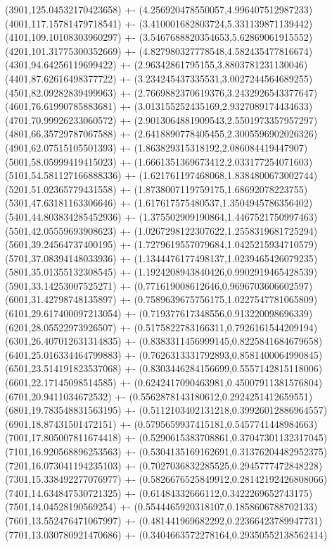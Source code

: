 {(3901,125.04532170423658) +- (4.256920478550057,4.996407512987233)
(4001,117.15781479718541) +- (3.410001682803724,5.331139871139442)
(4101,109.10108303960297) +- (3.5467688820354653,5.62869061915552)
(4201,101.31775300352669) +- (4.827980327778548,4.582435477816674)
(4301,94.64256119699422) +- (2.96342861795155,3.8803781231130046)
(4401,87.62616498377722) +- (3.234245437335531,3.0027244564689255)
(4501,82.09282839499963) +- (2.7669882370619376,3.2432926543377647)
(4601,76.61990785883681) +- (3.013155252435169,2.9327089174434633)
(4701,70.99926233060572) +- (2.9013064881909543,2.5501973357957297)
(4801,66.35729787067588) +- (2.6418890778405455,2.3005596902026326)
(4901,62.07515105501393) +- (1.863829315318192,2.086084419447907)
(5001,58.05999419415023) +- (1.6661351369673412,2.033177254071603)
(5101,54.581127166888336) +- (1.621761197468068,1.8384800673002744)
(5201,51.02365779431558) +- (1.8738007119759175,1.68692078223755)
(5301,47.63181163306646) +- (1.617617575480537,1.3504945786356402)
(5401,44.803834285452936) +- (1.375502909190864,1.4467521750997463)
(5501,42.05559693908623) +- (1.0267298122307622,1.2558319681725294)
(5601,39.24564737400195) +- (1.7279619557079684,1.0425215934710579)
(5701,37.08394148033936) +- (1.1344476177498137,1.0239465426079235)
(5801,35.01355132308545) +- (1.1924208943840426,0.9902919465428539)
(5901,33.14253007525271) +- (0.771619008612646,0.9696703606602597)
(6001,31.42798748135897) +- (0.7589639675756175,1.0227547781065809)
(6101,29.617400097213054) +- (0.719377617348556,0.913220098696339)
(6201,28.05522973926507) +- (0.5175822783166311,0.7926161544209194)
(6301,26.407012631314835) +- (0.8383311456999145,0.8225841684679658)
(6401,25.016334464799883) +- (0.7626313331792893,0.8581400064990845)
(6501,23.514191823537068) +- (0.8303446284156699,0.5557142815118006)
(6601,22.17145098514585) +- (0.6242417090463981,0.45007911381576804)
(6701,20.9411034672532) +- (0.5562878143180612,0.2924251412659551)
(6801,19.783548831563195) +- (0.5112103402131218,0.39926012886964557)
(6901,18.87431501472151) +- (0.5795659937415181,0.5457741448984663)
(7001,17.805007811674418) +- (0.5290615383708861,0.37047301132317045)
(7101,16.920568896253563) +- (0.5304135169162691,0.31376204482952375)
(7201,16.073041194235103) +- (0.7027036832285525,0.2945777472848228)
(7301,15.338492277076977) +- (0.5826676525849912,0.28142192426808066)
(7401,14.634847530721325) +- (0.61484332666112,0.3422269652743175)
(7501,14.04528190569254) +- (0.5544465920318107,0.1858606788702133)
(7601,13.552476471067997) +- (0.481441969682292,0.22366423789947731)
(7701,13.030780921470686) +- (0.3404663572278164,0.29350552138562414)
}
